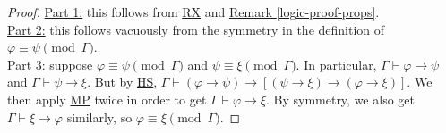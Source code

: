 \documentclass{treatise}
\begin{document}
\begin{proof}
\underline{Part 1:} this follows from \hyperref[HPL-T-RX]{RX} and \hyperref[logic-proof-props]{Remark \ref*{logic-proof-props}}.
\\
\underline{Part 2:} this follows vacuously from the symmetry in the definition of $\varphi \equiv \psi \pmod{\Gamma}$.
\\
\underline{Part 3:} suppose $\varphi \equiv \psi \pmod{\Gamma}$ and $\psi \equiv \xi \pmod{\Gamma}$. In particular, $\Gamma \vdash \varphi \to \psi$ and $\Gamma \vdash \psi \to \xi$. But by \hyperref[HPL-T-HS]{HS}, $\Gamma \vdash (\varphi \to \psi) \to [(\psi \to \xi) \to (\varphi \to \xi)]$. We then apply \hyperref[HPL-R-MP]{MP} twice in order to get $\Gamma \vdash \varphi \to \xi$. By symmetry, we also get $\Gamma \vdash \xi \to \varphi$ similarly, so $\varphi \equiv \xi \pmod{\Gamma}$.
\end{proof}
\end{document}
